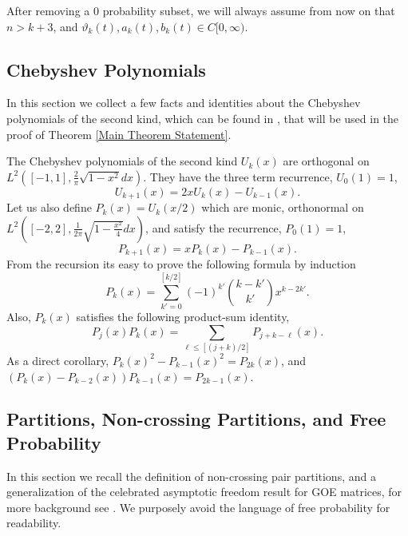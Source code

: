 \documentclass{amsart}
\numberwithin{equation}{section}
\begin{document}
After removing a $0$ probability subset, we will always assume from now on that $n>k+3$, and $\vartheta_k(t), a_k(t), b_k(t) \in C[0,\infty)$.

\subsection{Chebyshev Polynomials}\label{Chebyshev Polynomial Section}
In this section we collect a few facts and identities about the Chebyshev polynomials of the second kind, which can be found in \cite{abramowitz1948handbook}, that will be used in the proof of Theorem \ref{Main Theorem Statement}. 

The Chebyshev polynomials of the second kind $U_k(x)$ are orthogonal on $L^2([-1,1],\frac{2}{\pi} \sqrt{1-x^2}dx)$. They have the three term recurrence, $U_0(1)=1$,
\begin{equation*}
    U_{k+1}(x) = 2x U_k(x)-U_{k-1}(x).
\end{equation*}
Let us also define $P_k(x) = U_k(x/2)$ which are monic, orthonormal on $L^2([-2,2],\frac{1}{2\pi}\sqrt{1-\frac{x^2}{4}} dx)$, and satisfy the recurrence, $P_0(1)=1$,
\begin{equation}
    P_{k+1}(x) = x P_k(x)-P_{k-1}(x).
    \label{Three term reccurence}
\end{equation}
From the recursion its easy to prove the following formula by induction
\begin{equation}
    P_k(x)=\sum_{k'=0}^{[k/2]} (-1)^{k'}\binom{k-k'}{k'} x^{k-2k'}.
    \label{P_k(x) explicit formula}
\end{equation}
Also, $P_k(x)$ satisfies the following product-sum identity,
\begin{equation*}
        P_{j}(x)P_k(x) = \sum_{\ell \leq [(j+k)/2]} P_{j+k-\ell}(x).
\end{equation*}
As a direct corollary, $P_{k}(x)^2-P_{k-1}(x)^2=P_{2k}(x)$, and $(P_{k}(x)-P_{k-2}(x))P_{k-1}(x)=P_{2k-1}(x)$.

\subsection{Partitions, Non-crossing Partitions, and Free Probability}\label{Non-crossing Partitions}

In this section we recall the definition of non-crossing pair partitions, and a generalization of the celebrated asymptotic freedom result for GOE matrices, for more background see \cite{Nica_Speicher_2006}. We purposely avoid the language of free probability for readability.
\end{document}
